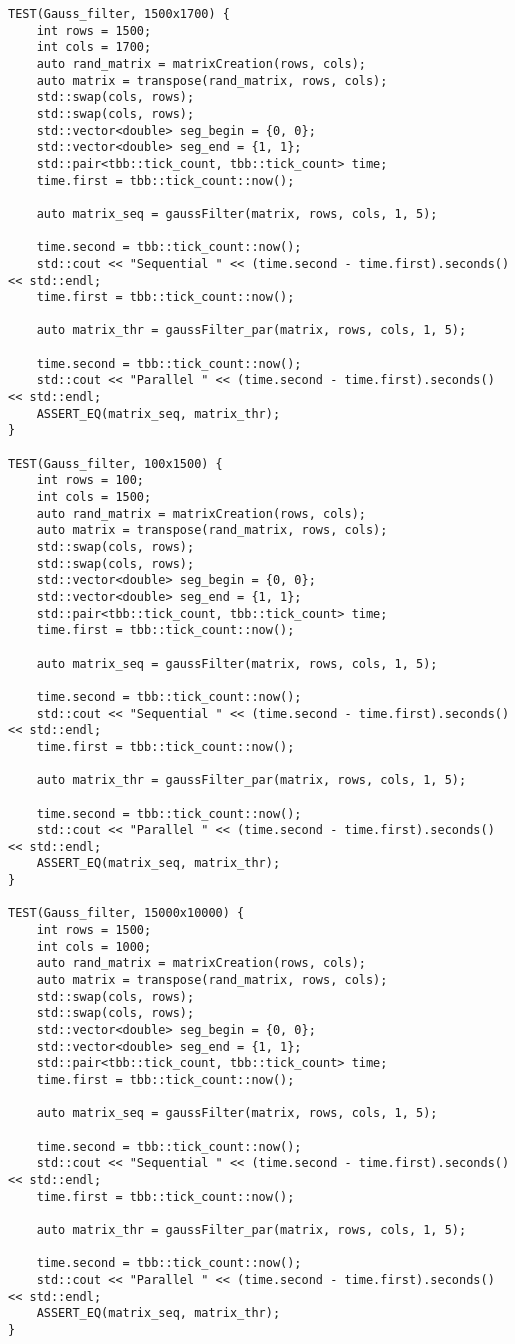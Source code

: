 \documentclass{report}
\begin{document}
\begin{lstlisting}
TEST(Gauss_filter, 1500x1700) {
	int rows = 1500;
	int cols = 1700;
	auto rand_matrix = matrixCreation(rows, cols);
	auto matrix = transpose(rand_matrix, rows, cols);
	std::swap(cols, rows);
	std::swap(cols, rows);
	std::vector<double> seg_begin = {0, 0};
	std::vector<double> seg_end = {1, 1};
	std::pair<tbb::tick_count, tbb::tick_count> time;
	time.first = tbb::tick_count::now();
	
	auto matrix_seq = gaussFilter(matrix, rows, cols, 1, 5);
	
	time.second = tbb::tick_count::now();
	std::cout << "Sequential " << (time.second - time.first).seconds() << std::endl;
	time.first = tbb::tick_count::now();
	
	auto matrix_thr = gaussFilter_par(matrix, rows, cols, 1, 5);
	
	time.second = tbb::tick_count::now();
	std::cout << "Parallel " << (time.second - time.first).seconds() << std::endl;
	ASSERT_EQ(matrix_seq, matrix_thr);
}

TEST(Gauss_filter, 100x1500) {
	int rows = 100;
	int cols = 1500;
	auto rand_matrix = matrixCreation(rows, cols);
	auto matrix = transpose(rand_matrix, rows, cols);
	std::swap(cols, rows);
	std::swap(cols, rows);
	std::vector<double> seg_begin = {0, 0};
	std::vector<double> seg_end = {1, 1};
	std::pair<tbb::tick_count, tbb::tick_count> time;
	time.first = tbb::tick_count::now();
	
	auto matrix_seq = gaussFilter(matrix, rows, cols, 1, 5);
	
	time.second = tbb::tick_count::now();
	std::cout << "Sequential " << (time.second - time.first).seconds() << std::endl;
	time.first = tbb::tick_count::now();
	
	auto matrix_thr = gaussFilter_par(matrix, rows, cols, 1, 5);
	
	time.second = tbb::tick_count::now();
	std::cout << "Parallel " << (time.second - time.first).seconds() << std::endl;
	ASSERT_EQ(matrix_seq, matrix_thr);
}

TEST(Gauss_filter, 15000x10000) {
	int rows = 1500;
	int cols = 1000;
	auto rand_matrix = matrixCreation(rows, cols);
	auto matrix = transpose(rand_matrix, rows, cols);
	std::swap(cols, rows);
	std::swap(cols, rows);
	std::vector<double> seg_begin = {0, 0};
	std::vector<double> seg_end = {1, 1};
	std::pair<tbb::tick_count, tbb::tick_count> time;
	time.first = tbb::tick_count::now();
	
	auto matrix_seq = gaussFilter(matrix, rows, cols, 1, 5);
	
	time.second = tbb::tick_count::now();
	std::cout << "Sequential " << (time.second - time.first).seconds() << std::endl;
	time.first = tbb::tick_count::now();
	
	auto matrix_thr = gaussFilter_par(matrix, rows, cols, 1, 5);
	
	time.second = tbb::tick_count::now();
	std::cout << "Parallel " << (time.second - time.first).seconds() << std::endl;
	ASSERT_EQ(matrix_seq, matrix_thr);
}

	
\end{lstlisting}
\end{document}
